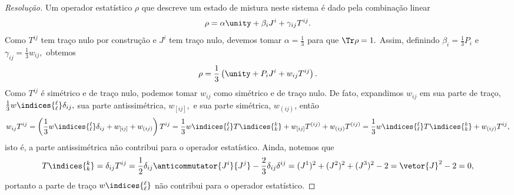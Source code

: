 \begin{proof}[Resolução]
    Um operador estatístico \(\rho\) que descreve um estado de mistura neste sistema é dado pela combinação linear
    \begin{equation*}
        \rho = \alpha\unity + \beta_i J^i + \gamma_{ij} T^{ij}.
    \end{equation*}
    Como \(T^{ij}\) tem traço nulo por construção e \(J^i\) tem traço nulo, devemos tomar \(\alpha = \frac13\) para que \(\Tr\rho = 1.\) Assim, definindo \(\beta_i = \frac13 P_i\) e \(\gamma_{ij} = \frac13 w_{ij},\) obtemos
    \begin{equation*}
        \rho = \frac13 \left(\unity + P_i J^i + w_{ij} T^{ij}\right).
    \end{equation*}
    Como \(T^{ij}\) é simétrico e de traço nulo, podemos tomar \(w_{ij}\) como simétrico e de traço nulo. De fato, expandimos \(w_{ij}\) em sua parte de traço, \(\frac13 w\indices{^\ell_{\ell}}\delta_{ij},\) sua parte antissimétrica, \(w_{[ij]},\) e sua parte simétrica, \(w_{(ij)}\), então
    \begin{equation*}
        w_{ij} T^{ij} = \left(\frac13 w\indices{^\ell_{\ell}} \delta_{ij} + w_{[ij]}+ w_{(ij)}\right)T^{ij} = \frac13 w\indices{^\ell_\ell} T\indices{^k_k} + w_{[ij]} T^{(ij)} + w_{(ij)}T^{(ij)} = \frac13 w\indices{^\ell_\ell} T\indices{^k_k} + w_{(ij)} T^{ij},
    \end{equation*}
    isto é, a parte antissimétrica não contribui para o operador estatístico. Ainda, notemos que
    \begin{equation*}
        T\indices{^k_k} = \delta_{ij} T^{ij} = \frac12 \delta_{ij} \anticommutator{J^i}{J^j} - \frac23 \delta_{ij} \delta^{ij} = (J^1)^2 + (J^2)^2 + (J^3)^2 - 2 = \vetor{J}^2 - 2 = 0,
    \end{equation*}
    portanto a parte de traço \(w\indices{^\ell_\ell}\) não contribui para o operador estatístico.


\end{proof}
